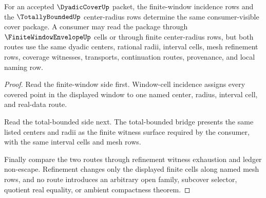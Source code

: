 \begin{theorem}
\label{thm:dyadic-cover-finite-window-total-bounded-correspondence}
For an accepted $\DyadicCoverUp$ packet, the finite-window incidence rows and
the $\TotallyBoundedUp$ center-radius rows determine the same
consumer-visible cover package. A consumer may read the package through
$\FiniteWindowEnvelopeUp$ cells or through finite center-radius rows, but both
routes use the same dyadic centers, rational radii, interval cells, mesh
refinement rows, coverage witnesses, transports, continuation routes,
provenance, and local naming row.
\end{theorem}
\begin{proof}
Read the finite-window side first. Window-cell incidence assigns every
covered point in the displayed window to one named center, radius, interval
cell, and real-data route.

Read the total-bounded side next. The total-bounded bridge presents the same
listed centers and radii as the finite witness surface required by the
consumer, with the same interval cells and mesh rows.

Finally compare the two routes through refinement witness exhaustion and
ledger non-escape. Refinement changes only the displayed finite cells along
named mesh rows, and no route introduces an arbitrary open family, subcover
selector, quotient real equality, or ambient compactness theorem.
\end{proof}

